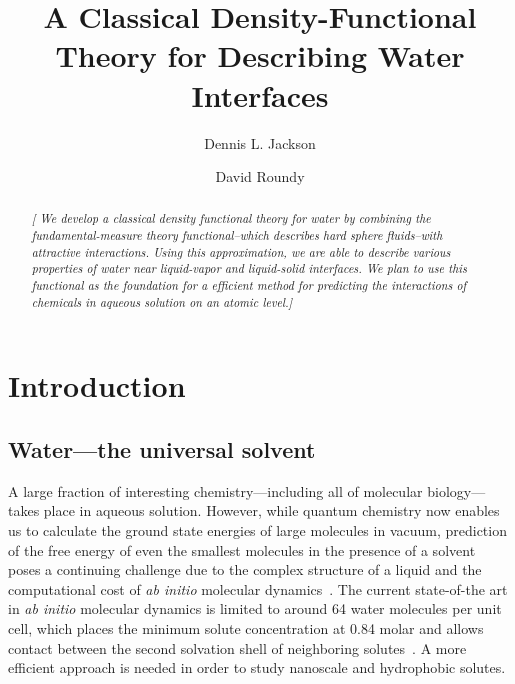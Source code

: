 \documentclass[letterpaper,twocolumn,amsmath,amssymb,prb]{revtex4}
\newcommand{\needsworklater}[1]{\emph{[#1]}}
\begin{document}
\title{A Classical Density-Functional Theory for Describing Water Interfaces}

\author{Dennis L. Jackson}

\author{David Roundy}

\begin{abstract}
\needsworklater{ We develop a classical density functional theory for
  water by combining the fundamental-measure theory functional--which
  describes hard sphere fluids--with attractive interactions.  Using
  this approximation, we are able to describe various properties of
  water near liquid-vapor and liquid-solid interfaces.  We plan to use
  this functional as the foundation for a efficient method for
  predicting the interactions of chemicals in aqueous solution on an
  atomic level.}
\end{abstract}

\maketitle

\section{Introduction}

\subsection{Water---the universal solvent}

A large fraction of interesting chemistry---including all of molecular
biology---takes place in aqueous solution.  However, while quantum chemistry
now enables us to calculate the ground state energies of large molecules in
vacuum, prediction of the free energy of even the smallest molecules in the
presence of a solvent poses a continuing challenge due to the complex
structure of a liquid and the computational cost of \emph{ab initio}
molecular dynamics~\cite{car1985, grossman2004}.  The current state-of-the
art in \emph{ab initio} molecular dynamics is limited to around 64 water
molecules per unit cell, which places the minimum solute concentration at
0.84 molar and allows contact between the second solvation shell of
neighboring solutes~\cite{izvekov2005, choe2007}.  A more efficient
approach is needed in order to study nanoscale and hydrophobic solutes.
\end{document}
